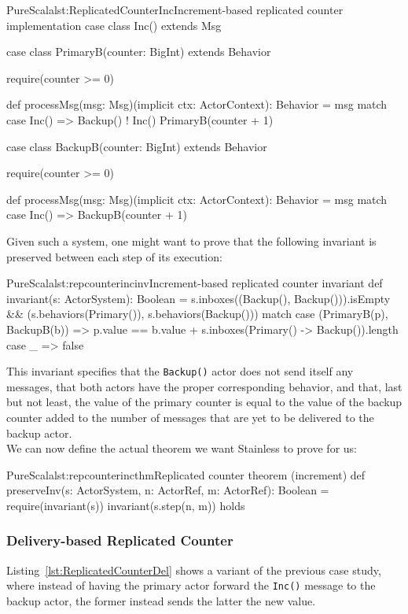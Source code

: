 \documentclass[a4paper,twoside]{article}
\newcommand{\RefCode}[1]{Listing~\ref{#1}}
\newcommand{\stt}[1]{\texttt{\small{#1}}}
\begin{document}
\begin{enumerate}
\begin{Code}{PureScala}{lst:ReplicatedCounterInc}{Increment-based replicated counter implementation}
case class Inc() extends Msg

case class PrimaryB(counter: BigInt) extends Behavior {
  require(counter >= 0)

  def processMsg(msg: Msg)(implicit ctx: ActorContext): Behavior = msg match {
    case Inc() =>
      Backup() ! Inc()
      PrimaryB(counter + 1)
  }
}

case class BackupB(counter: BigInt) extends Behavior {
  require(counter >= 0)

  def processMsg(msg: Msg)(implicit ctx: ActorContext): Behavior = msg match {
    case Inc() => BackupB(counter + 1)
  }
}
\end{Code}

Given such a system, one might want to prove that the following invariant is 
preserved between each step of its execution:

\begin{Code}{PureScala}{lst:repcounterincinv}{Increment-based replicated counter invariant}
def invariant(s: ActorSystem): Boolean = {
  s.inboxes((Backup(), Backup())).isEmpty && {
    (s.behaviors(Primary()), s.behaviors(Backup())) match {
      case (PrimaryB(p), BackupB(b)) =>
        p.value == b.value + s.inboxes(Primary() -> Backup()).length
      case _ => false
    }	
  }
}
\end{Code}

This invariant specifies that the \stt{Backup()} actor does not send itself any messages, that both actors have the proper corresponding behavior, and that, last but not least, the value of the primary counter is equal to the value of the backup counter added to the number of messages that are yet to be delivered to the backup actor.\\

We can now define the actual theorem we want Stainless to prove for us:

\begin{Code}{PureScala}{lst:repcounterincthm}{Replicated counter theorem (increment)}
def preserveInv(s: ActorSystem, n: ActorRef, m: ActorRef): Boolean = {
  require(invariant(s))
  invariant(s.step(n, m))
} holds
\end{Code}

\subsubsection{Delivery-based Replicated Counter}

\RefCode{lst:ReplicatedCounterDel} shows a variant of the previous case study, where instead of having the primary actor forward the \stt{Inc()} message to the backup actor, the former instead sends the latter the new value.


\end{enumerate}
\end{document}

